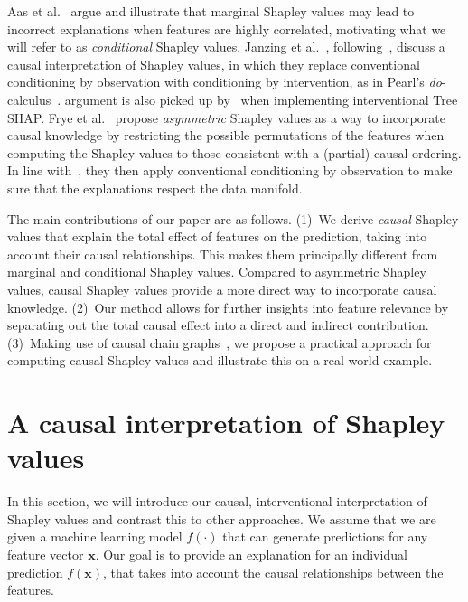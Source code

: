 \documentclass{article}
\newcommand{\vx}{\mathbf{x}}
\begin{document}
Aas et al.~\cite{aas2019explaining} argue and illustrate that marginal Shapley values may lead to incorrect explanations when features are highly correlated, motivating what we will refer to as {\em conditional} Shapley values. Janzing et al.~\cite{janzing2019feature}, following~\cite{datta2016algorithmic}, discuss a causal interpretation of Shapley values, in which they replace conventional conditioning by observation with conditioning by intervention, as in Pearl's {\em do}-calculus~\cite{pearl2012calculus}.   argument is also picked up by~\cite{lundberg2020local} when implementing interventional Tree SHAP. Frye et al.~\cite{frye2019asymmetric} propose {\em asymmetric} Shapley values as a way to incorporate causal knowledge  by restricting the possible permutations of the features when computing the Shapley values to those consistent with a (partial) causal ordering. In line with~\cite{aas2019explaining}, they then apply conventional conditioning by observation to make sure that the explanations respect the data manifold.

The main contributions of our paper are as follows.
(1)~We derive {\em causal} Shapley values that explain the total effect of features on the prediction, taking into account their causal relationships. This makes them principally different from marginal and conditional Shapley values. Compared to asymmetric Shapley values, causal Shapley values provide a more direct way to incorporate causal knowledge. (2)~Our method allows for further insights into feature relevance by separating out the total causal effect into a direct and indirect contribution. 
(3)~Making use of causal chain graphs~\cite{lauritzen2002chain}, we propose a practical approach for computing causal Shapley values and illustrate this on a real-world example.

\section{A causal interpretation of Shapley values}
\label{sec:interpretation}

In this section, we will introduce our causal, interventional interpretation of Shapley values and contrast this to other approaches. We assume that we are given a machine learning model $f(\cdot)$ that can generate predictions for any feature vector $\vx$. Our goal is to provide an explanation for an individual prediction $f(\vx)$, that takes into account the causal relationships between the features.
\end{document}
